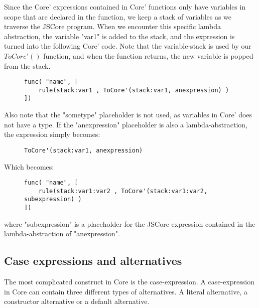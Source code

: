 Since the Core' expressions contained in Core' functions only have variables in 
scope that are declared in the function, we keep a stack of variables as we traverse
the JSCore program. When we encounter this specific lambda abstraction, the variable
"var1" is added to the stack, and the expression is turned into the following Core' code. 
Note that the variable-stack is used by our $ToCore'()$ function, and when
the function returns, the new variable is popped from the stack.

\begin{figure}[H]
\lstset{ %
language=Haskell,
caption=Lambda abstraction in Core' format,
label=lst:int1
}
\begin{lstlisting}
func( "name", [
    rule(stack:var1 , ToCore'(stack:var1, anexpression) )
])
\end{lstlisting}
\end{figure}

Also note that the "sometype" placeholder is not used, as variables in Core' does
not have a type. If the "anexpression" placeholder is also a lambda-abstraction, the
expression simply becomes:

\begin{figure}[H]
\lstset{ %
language=Haskell,
caption=Lambda abstraction in Core' format,
label=lst:int1
}
\begin{lstlisting}
ToCore'(stack:var1, anexpression)
\end{lstlisting}
\end{figure}

Which becomes:

\begin{figure}[H]
\lstset{ %
language=Haskell,
caption=Lambda abstraction in Core' format,
label=lst:int1
}
\begin{lstlisting}
func( "name", [
    rule(stack:var1:var2 , ToCore'(stack:var1:var2, subexpression) )
])
\end{lstlisting}
\end{figure}

where "subexpression" is a placeholder for the JSCore expression contained in the 
lambda-abstraction of "anexpression".


\subsection*{Case expressions and alternatives}

The most complicated construct in Core is the case-expression. A case-expression
in Core can contain three different types of alternatives. A literal alternative,
a constructor alternative or a default alternative. 

